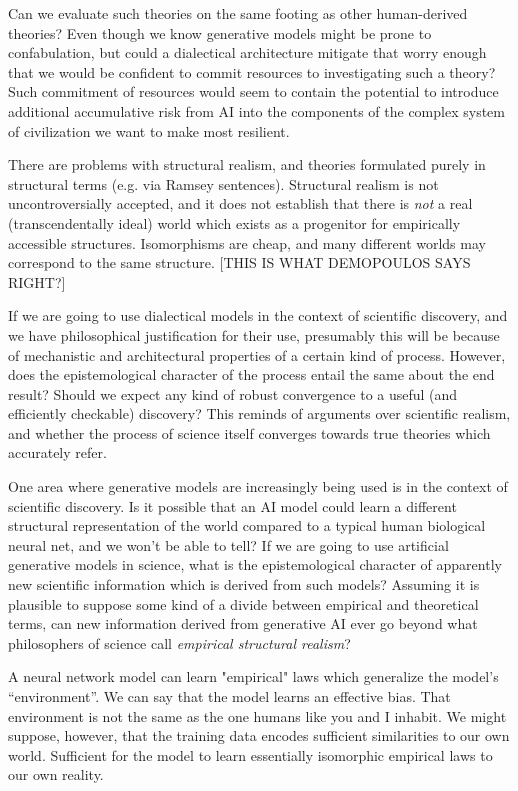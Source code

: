 \documentclass[11pt, oneside]{article}   	%
\begin{document}
Can we evaluate such theories on the same footing as other human-derived theories?  Even though we know generative models might be prone to confabulation, but could a dialectical architecture mitigate that worry enough that we would be confident to commit resources to investigating such a theory?  Such commitment of resources would seem to contain the potential to introduce additional accumulative risk from AI into the components of the complex system of civilization we want to make most resilient.


There are problems with structural realism, and theories formulated purely in structural terms (e.g. via Ramsey sentences).  Structural realism is not uncontroversially accepted, and it does not establish that there is \emph{not} a real (transcendentally ideal) world which exists as a progenitor for empirically accessible structures.  Isomorphisms are cheap, and many different worlds may correspond to the same structure.  [THIS IS WHAT DEMOPOULOS SAYS RIGHT?]


If we are going to use dialectical models in the context of scientific discovery, and we have philosophical justification for their use, presumably this will be because of mechanistic and architectural properties of a certain kind of process.  However, does the epistemological character of the process entail the same about the end result?  Should we expect any kind of robust convergence to a useful (and efficiently checkable) discovery?  This reminds of arguments over scientific realism, and whether the process of science itself converges towards true theories which accurately refer.  






One area where generative models are increasingly being used is in the context of scientific discovery.  Is it possible that an AI model could learn a different structural representation of the world compared to a typical human biological neural net, and we won’t be able to tell?  If we are going to use artificial generative models in science, what is the epistemological character of apparently new scientific information which is derived from such models?  Assuming it is plausible to suppose some kind of a divide between empirical and theoretical terms, can new information derived from generative AI ever go beyond what philosophers of science call \emph{empirical structural realism}?

A neural network model can learn "empirical" laws which generalize the model's ``environment''.  We can say that the model learns an effective bias. That environment is not the same as the one humans like you and I inhabit.   We might suppose, however, that the training data encodes sufficient similarities to our own world.  Sufficient for the model to learn essentially isomorphic empirical laws to our own reality.
\end{document}
